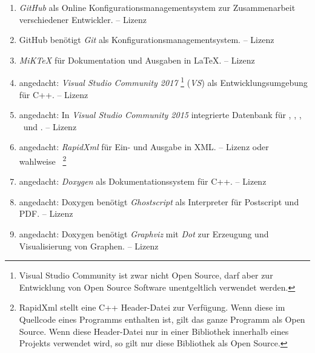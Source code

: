 \begin{enumerate}
	\setcounter{enumi}{\value{Enumi}}%

	\item\label{Werkzeug:GitHub}\emph{GitHub} als Online Konfigurationsmanagementsystem zur Zusammenarbeit verschiedener Entwickler.
	-- Lizenz 

	\item\label{Werkzeug:Git}GitHub benötigt \emph{Git} als Konfigurationsmanagementsystem.
	-- Lizenz 

	\item\label{Werkzeug:MiKTeX}\emph{MiK\TeX} für Dokumentation und Ausgaben in \LaTeX.
	-- Lizenz 

	\item\label{Werkzeug:VSC}angedacht: \emph{Visual Studio Community 2017}%
	\footnote{%
		Visual Studio Community ist zwar nicht Open Source, darf aber zur Entwicklung von Open Source Software
		unentgeltlich verwendet werden.
	}
	(\emph{VS}) als Entwicklungsumgebung für C++.
	-- Lizenz 

	\item\label{Werkzeug:VSC DB}angedacht: In \emph{Visual Studio Community 2015} integrierte Datenbank für \Ausgabeschemata, \Saetze, \Beweise, \Fachbegriffe\ und \Fachgebiete.
	-- Lizenz 

	\item\label{Werkzeug:RapidXml}angedacht: \emph{RapidXml} für Ein- und Ausgabe in XML.
	-- Lizenz  oder wahlweise~\cite{bib:MIT}
	\footnote{%
		RapidXml stellt eine C++ Header-Datei zur Verfügung.
		Wenn diese im Quellcode eines Programms enthalten ist, gilt das ganze Programm als Open Source.
		Wenn diese Header-Datei nur in einer Bibliothek innerhalb eines Projekts verwendet wird, so gilt nur diese Bibliothek als Open Source.
	}

	\item\label{Werkzeug:Doxygen}angedacht: \emph{Doxygen} als Dokumentationssystem für C++.
	-- Lizenz 

	\item\label{Werkzeug:Ghostscript}angedacht: Doxygen benötigt \emph{Ghostscript} als Interpreter für Postscript und PDF.
	-- Lizenz 

	\item\label{Werkzeug:Graphviz}angedacht: Doxygen benötigt \emph{Graphviz} mit \emph{Dot} zur Erzeugung und Visualisierung von Graphen.
	-- Lizenz 

	\setcounter{Enumi}{\value{enumi}}%
\end{enumerate}

